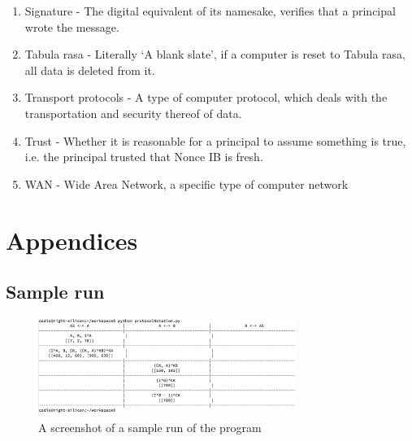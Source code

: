\documentclass{article}
\begin{document}
\begin{enumerate}
    \item Signature - The digital equivalent of its namesake, verifies that a principal wrote the message.
    \item Tabula rasa - Literally ‘A blank slate’, if a computer is reset to Tabula rasa, all data is deleted from it.
    \item Transport protocols - A type of computer protocol, which deals with the transportation and security thereof of data.
    \item Trust - Whether it is reasonable for a principal to assume something is true, i.e. the principal trusted that Nonce IB is fresh.
    \item WAN - Wide Area Network, a specific type of computer network           
\end{enumerate}



\newpage
\section{Appendices}
\subsection{Sample run}
\begin{figure}[ht]
    \centering
    \includegraphics[width=0.75\textwidth]{sampleRun.png}
    \caption{A screenshot of a sample run of the program}
    \label{fig:sampleRun}
\end{figure}
\end{document}
